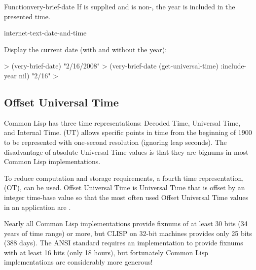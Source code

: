 \documentclass[10pt,twoside,english,pdftex]{article}
\begin{document}
\begin{functiondoc}{Function}{very-brief-date}
\W{} 
%
If  is supplied and is non-\nil, the year is included in
the presented time.

\begin{alsos}{internet-text-date-and-time}
\end{alsos}

\fnexamples
Display the current date (with and without the year):
%
\W\supp
\begin{example}
  > (very-brief-date)
  "2/16/2008"
  > (very-brief-date (get-universal-time) :include-year nil)
  "2/16"
  >
\end{example}

\end{functiondoc}


\T\markright{}%
\T\pagestyle{plain}
\T\clearpage
\W{}
\T\pagestyle{fancy}
\T\thispagestyle{fancybottom}
\T\global\def\fnlastname{ }%

\subsection{Offset Universal Time}
\label{sec:offsettime}%

%
Common Lisp has three time representations: Decoded Time, Universal
Time, and Internal Time.   (UT) allows specific points
in time from the beginning of 1900 to be represented with one-second
resolution (ignoring leap seconds).  The disadvantage of absolute
Universal Time values is that they are bignums in most Common Lisp
implementations.

To reduce computation and storage requirements, a fourth time
representation,  (OT), can be used.  Offset
Universal Time is Universal Time that is offset by an integer
time-base value so that the most often used Offset Universal Time
values in an application are .

Nearly all Common Lisp implementations provide fixnums of at least 30
bits (34 years of time range) or more, but CLISP on 32-bit machines
provides only 25 bits (388 days).  The ANSI standard requires an
implementation to provide fixnums with at least 16 bits (only 18
hours), but fortunately Common Lisp implementations are considerably more
generous!
\end{document}
